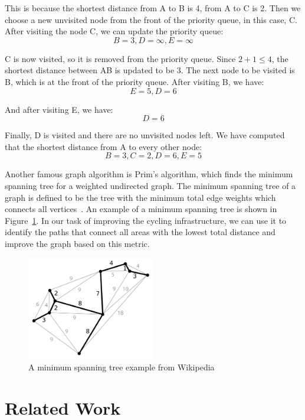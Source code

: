 \documentclass[12pt,a4paper]{report}
\begin{document}
This is because the shortest distance from A to B is 4, from A to C is 2. Then we choose a new unvisited node from the front of the priority queue, in this case, C. After visiting the node C, we can update the priority queue:
\[B=3, D=\infty, E=\infty\]

C is now visited, so it is removed from the priority queue. Since $2+1 \leq 4$, the shortest distance between AB is updated to be 3. The next node to be visited is B, which is at the front of the priority queue. After visiting B, we have:
\[E=5, D=6\]

And after visiting E, we have:
\[D=6\]

Finally, D is visited and there are no unvisited nodes left. We have computed that the shortest distance from A to every other node:
\[B=3, C=2, D=6, E=5\]

Another famous graph algorithm is Prim's algorithm, which finds the minimum spanning tree for a weighted undirected graph. The minimum spanning tree of a graph is defined to be the tree with the minimum total edge weights which connects all vertices~\cite{Pettie2008}. An example of a minimum spanning tree is shown in Figure~\ref{fig:mst_example}. In our task of improving the cycling infrastructure, we can use it to identify the paths that connect all areas with the lowest total distance and improve the graph based on this metric.

\begin{figure}[ht]
\centering
\includegraphics[width=0.5\textwidth]{diss_images/context/MST.png}
\caption{A minimum spanning tree example from Wikipedia~\cite{WikipediaEN:MST}}
\label{fig:mst_example}
\end{figure}

\section{Related Work} \label{sec:related_work}
\end{document}
